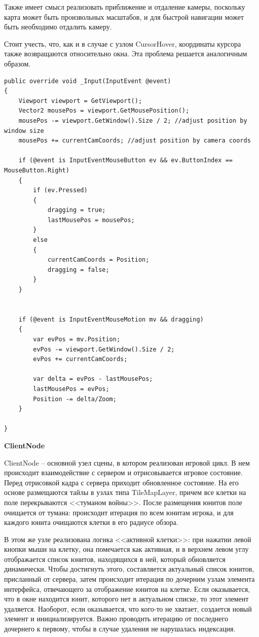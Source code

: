             Также имеет смысл реализовать приближение и отдаление камеры, поскольку карта может быть произвольных масштабов, и для быстрой навигации может быть необходимо
            отдалить камеру.

            Стоит учесть, что, как и в случае с узлом CursorHover, координаты курсора также возвращаются относительно окна. Эта проблема решается аналогичным образом.

            \begin{lstlisting}[caption=Реализация перемещения камеры]
public override void _Input(InputEvent @event)
{
    Viewport viewport = GetViewport();
    Vector2 mousePos = viewport.GetMousePosition();
    mousePos -= viewport.GetWindow().Size / 2; //adjust position by window size
    mousePos += currentCamCoords; //adjust position by camera coords

    if (@event is InputEventMouseButton ev && ev.ButtonIndex == MouseButton.Right)
    {
        if (ev.Pressed)
        {
            dragging = true;
            lastMousePos = mousePos;
        }
        else
        {
            currentCamCoords = Position;
            dragging = false;
        }
    }


    if (@event is InputEventMouseMotion mv && dragging)
    {
        var evPos = mv.Position;
        evPos -= viewport.GetWindow().Size / 2;
        evPos += currentCamCoords;

        var delta = evPos - lastMousePos;
        lastMousePos = evPos;
        Position -= delta/Zoom;
    }

}
            \end{lstlisting}

            \textbf{ClientNode}

            ClientNode -- основной узел сцены, в котором реализован игровой цикл. В нем происходит взаимодействие с сервером и отрисовывается игровое
            состояние. Перед отрисовкой кадра с сервера приходит обновленное состояние. На его основе размещаются тайлы в узлах типа TileMapLayer, причем
            все клетки на поле перекрываются <<туманом войны>>. После размещения юнитов поле очищается от тумана: происходит итерация по всем юнитам игрока,
            и для каждого юнита очищаются клетки в его радиусе обзора.
            
            В этом же узле реализована логика <<активной клетки>>: при нажатии левой кнопки мыши на клетку, она помечается как активная, и в верхнем левом углу
            отображается список юнитов, находящихся в ней, который обновляется динамически. Чтобы достигнуть этого, составляется актуальный список юнитов, 
            присланный от сервера, затем происходит итерация по дочерним узлам элемента интерфейса, отвечающего за отображение юнитов на клетке. Если 
            оказывается, что в окне находится юнит, которого нет в актуальном списке, то этот элемент удаляется. Наоборот, если оказывается, что кого-то
            не хватает, создается новый элемент и инициализируется. Важно проводить итерацию от последнего дочернего к первому, чтобы в случае удаления
            не нарушалась индексация.
            
